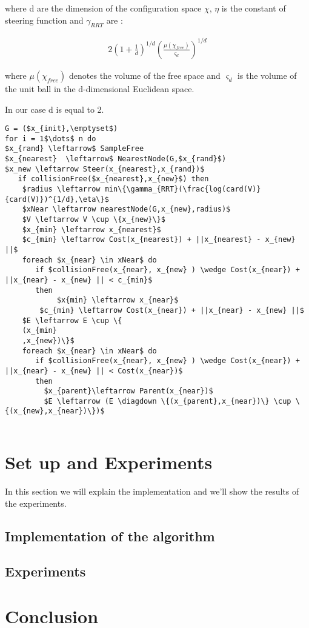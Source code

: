 \documentclass[10pt]{article}
\begin{document}
	where d are the dimension of the configuration space $\chi$, $\eta$ is the constant of steering function and $\gamma_{RRT}$ are :
	
	\begin{align}
	2\left(1+\frac{1}{d}\right)^{1/d} \left(\frac{\mu(\chi_{free})}{\varsigma_{d}}\right)^{1/d}
	\nonumber
	\end{align}
	
	where  $\mu(\chi_{free})$ denotes the volume of the free space and $\varsigma_{d}$ is the volume of the unit ball in the d-dimensional 	Euclidean space.
	
	In our case d is equal to 2.
	
		\begin{lstlisting}[frame=single, mathescape=true,caption={RRT*}]
G = ($x_{init},\emptyset$)
for i = 1$\dots$ n do
$x_{rand} \leftarrow$ SampleFree
$x_{nearest}  \leftarrow$ NearestNode(G,$x_{rand}$)
$x_new \leftarrow Steer(x_{nearest},x_{rand})$	
   if collisionFree($x_{nearest},x_{new}$) then
	$radius \leftarrow min\{\gamma_{RRT}(\frac{log(card(V)}{card(V)})^{1/d},\eta\}$
	$xNear \leftarrow nearestNode(G,x_{new},radius)$
	$V \leftarrow V \cup \{x_{new}\}$
	$x_{min} \leftarrow x_{nearest}$
	$c_{min} \leftarrow Cost(x_{nearest}) + ||x_{nearest} - x_{new} ||$
	foreach $x_{near} \in xNear$ do
	   if $collisionFree(x_{near}, x_{new} ) \wedge Cost(x_{near}) + ||x_{near} - x_{new} || < c_{min}$
	   then
	        $x{min} \leftarrow x_{near}$
		$c_{min} \leftarrow Cost(x_{near}) + ||x_{near} - x_{new} ||$
	$E \leftarrow E \cup \{
	(x_{min}
	,x_{new})\}$
	foreach $x_{near} \in xNear$ do
	   if $collisionFree(x_{near}, x_{new} ) \wedge Cost(x_{near}) + ||x_{near} - x_{new} || < Cost(x_{near})$
	   then
	     $x_{parent}\leftarrow Parent(x_{near})$
	     $E \leftarrow (E \diagdown \{(x_{parent},x_{near})\} \cup \{(x_{new},x_{near})\})$
	
	\end{lstlisting}
	
	\section{Set up and Experiments}
	In this section we will explain the implementation and we'll show the results of the experiments.
	\subsection{Implementation of the algorithm}
	\subsection{Experiments}
	\section{Conclusion}
\end{document}
